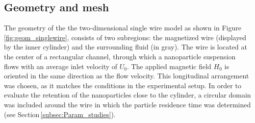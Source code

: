 \subsection{Geometry and mesh}
\label{subsec:geom}
The geometry of the the two-dimensional single wire model as shown in Figure\,\ref{fig:geom_singlewire}, consists of two subregions: the magnetized wire (displayed by the inner cylinder) and the surrounding fluid (in gray). The wire is located at the center of a rectangular channel, through which a nanoparticle suspension flows with an average inlet velocity of $U_{0}$. The applied magnetic field $H_{0}$ is oriented in the same direction as the flow velocity. This longitudinal arrangement was chosen, as it matches the conditions in the experimental setup. In order to evaluate the retention of the nanoparticles close to the cylinder, a circular domain was included around the wire in which the particle residence time was determined (see Section\,\ref{subsec:Param_studies}).

